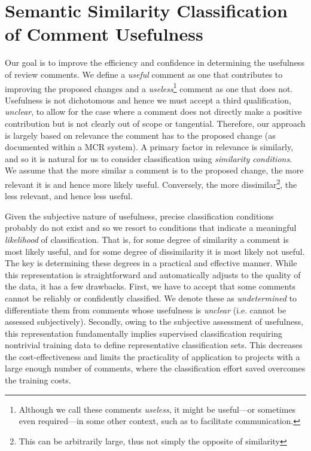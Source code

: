 
\section{Semantic Similarity Classification of Comment Usefulness}


Our goal is to improve the efficiency and confidence in determining the usefulness of review comments.
We define a \emph{useful} comment as one that contributes to improving the proposed changes and a \emph{useless}\footnote{Although we call these comments \emph{useless}, it might be useful---or sometimes even required---in some other context, such as to facilitate communication.} comment as one that does not.
Usefulness is not dichotomous and hence we must accept a third qualification, \emph{unclear}, to allow for the case where a comment does not directly make a positive contribution but is not clearly out of scope or tangential.
Therefore, our approach is largely based on relevance the comment has to the proposed change (as documented within a MCR system).
A primary factor in relevance is similarly, and so it is natural for us to consider classification using \emph{similarity conditions}\cite{Davies2012}. 
We assume that the more similar a comment is to the proposed change, the more relevant it is and hence more likely useful.
Conversely, the more dissimilar\footnote{This can be arbitrarily large, thus not simply the opposite of similarity}, the less relevant, and hence less useful.



Given the subjective nature of usefulness, precise classification conditions probably do not exist and so we resort to conditions that indicate a meaningful \emph{likelihood} of classification.
That is, for some degree of similarity a comment is most likely useful, and for some degree of dissimilarity it is most likely not useful.
The key is determining these degrees in a practical and effective manner.
While this representation is straightforward and automatically adjusts to the quality of the data, it has a few drawbacks.
First, we have to accept that some comments cannot be reliably or confidently classified.
We denote these as \emph{undetermined} to differentiate them from comments whose usefulness is \emph{unclear} (i.e. cannot be assessed subjectively).
Secondly, owing to the subjective assessment of usefulness, this representation fundamentally implies supervised classification requiring nontrivial training data to define representative classification sets.
This decreases the cost-effectiveness and limits the practicality of application to projects with a large enough number of comments, where the classification effort saved overcomes the training costs.  

